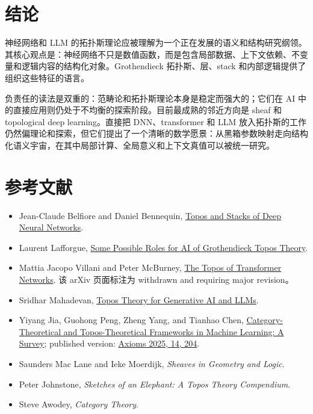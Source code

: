 \documentclass[UTF8,11pt,fontset=none]{ctexart}
\begin{document}
\section{结论}

神经网络和 LLM 的拓扑斯理论应被理解为一个正在发展的语义和结构研究纲领。其核心观点是：神经网络不只是数值函数，而是包含局部数据、上下文依赖、不变量和逻辑内容的结构化对象。Grothendieck 拓扑斯、层、stack 和内部逻辑提供了组织这些特征的语言。


负责任的读法是双重的：范畴论和拓扑斯理论本身是稳定而强大的；它们在 AI 中的直接应用则仍处于不均衡的探索阶段。目前最成熟的邻近方向是 sheaf 和 topological deep learning。直接把 DNN、transformer 和 LLM 放入拓扑斯的工作仍然偏理论和探索，但它们提出了一个清晰的数学愿景：从黑箱参数映射走向结构化语义宇宙，在其中局部计算、全局意义和上下文真值可以被统一研究。


\section{参考文献}

\begin{itemize}
\item Jean-Claude Belfiore and Daniel Bennequin,
\href{https://arxiv.org/abs/2106.14587}{Topos and Stacks of Deep Neural Networks}.

\item Laurent Lafforgue,
\href{https://www.laurentlafforgue.org/Expose_Lafforgue_topos_AI_ETH_sept_2022.pdf}{Some Possible Roles for AI of Grothendieck Topos Theory}.

\item Mattia Jacopo Villani and Peter McBurney,
\href{https://arxiv.org/abs/2403.18415}{The Topos of Transformer Networks}. 该 arXiv 页面标注为 withdrawn and requiring major revision。

\item Sridhar Mahadevan,
\href{https://arxiv.org/abs/2508.08293}{Topos Theory for Generative AI and LLMs}.

\item Yiyang Jia, Guohong Peng, Zheng Yang, and Tianhao Chen,
\href{https://arxiv.org/abs/2408.14014}{Category-Theoretical and Topos-Theoretical Frameworks in Machine Learning: A Survey}; published version: \href{https://doi.org/10.3390/axioms14030204}{Axioms 2025, 14, 204}.

\item Saunders Mac Lane and Ieke Moerdijk, \emph{Sheaves in Geometry and Logic}.
\item Peter Johnstone, \emph{Sketches of an Elephant: A Topos Theory Compendium}.
\item Steve Awodey, \emph{Category Theory}.
\end{itemize}
\end{document}
